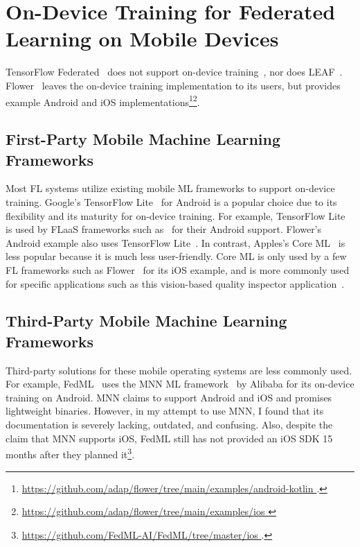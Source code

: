 \documentclass[conference]{IEEEtran}
\begin{document}
\section{On-Device Training for Federated Learning on Mobile Devices}

TensorFlow Federated~\cite{tff} does not support
on-device training~\cite{kholod2020open},
nor does LEAF~\cite{caldas2018leaf}.
Flower~\cite{beutel2020flower} leaves the on-device training implementation to
its users,
but provides example Android and iOS implementations\footnote{\url{
    https://github.com/adap/flower/tree/main/examples/android-kotlin
}.}\footnote{\url{
    https://github.com/adap/flower/tree/main/examples/ios
}}.

\subsection{First-Party Mobile Machine Learning Frameworks}

Most FL systems utilize existing mobile ML frameworks to
support on-device training.
Google's TensorFlow Lite~\cite{tensorflow2015-whitepaper,abadi2016tensorflow}
for Android is
a popular choice due to its flexibility and
its maturity for on-device training.
For example, TensorFlow Lite is used by FLaaS frameworks such as~\cite{
    kourtellis2020flaas,katevas2022flaas}
for their Android support.
Flower's Android example also uses
TensorFlow Lite~\cite{beutel2020flower,mathur2021ondevice}.
In contrast, Apples's Core ML~\cite{coreml} is less popular because
it is much less user-friendly.
Core ML is only used by a few FL frameworks such as
Flower~\cite{beutel2020flower} for its iOS example,
and is more commonly used for specific applications
such as this vision-based quality inspector application~\cite{bharti2022edge}.

\subsection{Third-Party Mobile Machine Learning Frameworks}

Third-party solutions for these mobile operating systems are less commonly used.
For example, FedML~\cite{he2020fedml} uses
the MNN ML framework~\cite{jiang2020mnn,lv2022walle} by Alibaba for
its on-device training on Android.
MNN claims to support Android and iOS and promises lightweight binaries.
However, in my attempt to use MNN, I found that its documentation is
severely lacking, outdated, and confusing.
Also, despite the claim that MNN supports iOS,
FedML still has not provided an iOS SDK 15 months after they planned
it\footnote{\url{
    https://github.com/FedML-AI/FedML/tree/master/ios
}.}.
\end{document}
